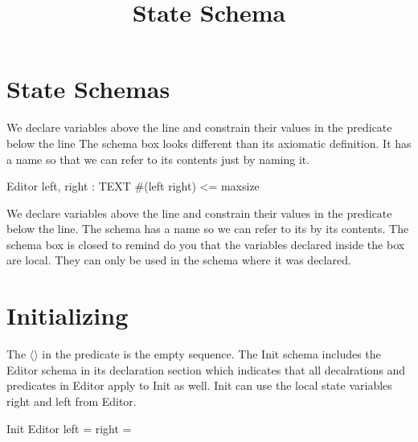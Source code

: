 \documentclass{article}
\title{State Schema}
\begin{document}
\maketitle

\section{State Schemas}
We declare variables above the line and constrain their values in the predicate below the line
The schema box looks different than its axiomatic definition.
It has a name so that we can refer to its contents just by naming it.

\begin{schema}{Editor}
    left, right : TEXT
\where
    \#(left \cat right) <= maxsize
\end{schema}

We declare variables above the line and constrain their values in the predicate
below the line. The schema has a name so we can refer to its by its contents.
The schema box is closed to remind do you that the variables declared inside
the box are local. They can only be used in the schema where it was declared.

\section{Initializing}
The $\langle \rangle$ in the predicate is the empty sequence.
The Init schema includes the Editor schema in its declaration section which
indicates that all decalrations and predicates in Editor apply to Init as well.
Init can use the local state variables right and left from Editor.

\begin{schema}{Init}
    Editor
    \where
    left = right = \langle \rangle
\end{schema}
\end{document}

